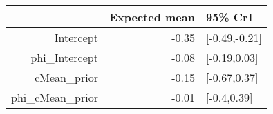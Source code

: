 \begin{tabular}{rrl}
  \hline
 & Expected mean & 95\% CrI \\ 
  \hline
Intercept & -0.35 & [-0.49,-0.21] \\ 
  phi\_Intercept & -0.08 & [-0.19,0.03] \\ 
  cMean\_prior & -0.15 & [-0.67,0.37] \\ 
  phi\_cMean\_prior & -0.01 & [-0.4,0.39] \\ 
   \hline
\end{tabular}

